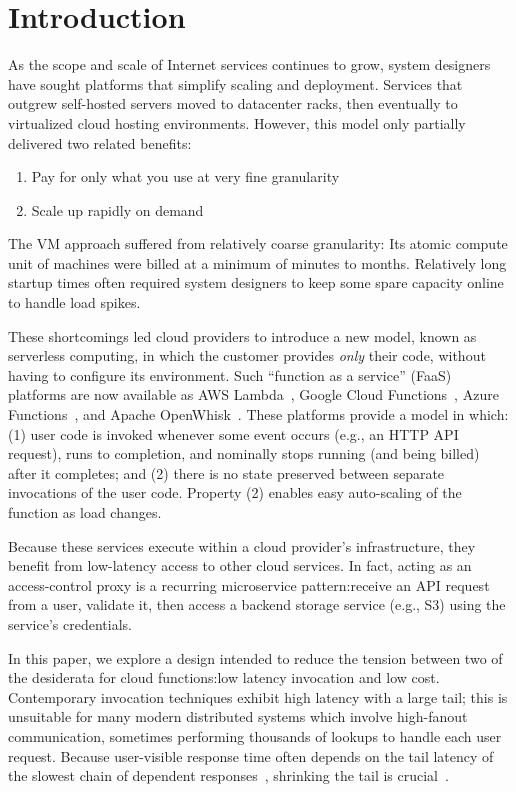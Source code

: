 \section{Introduction}
\label{sec:intro}

As the scope and scale of Internet services continues to grow, system designers
have sought platforms that simplify scaling and deployment.
Services that outgrew self-hosted servers moved to datacenter racks, then
eventually to virtualized cloud hosting environments.
However, this model only partially delivered two related benefits:
\begin{enumerate}
\item Pay for only what you use at very fine granularity
\item Scale up rapidly on demand
\end{enumerate}

\noindent
The VM approach suffered from relatively coarse granularity:  Its atomic compute unit
of machines were billed at a minimum of minutes to months.  Relatively long startup
times often required system designers to keep some spare capacity online to handle
load spikes.

These shortcomings led cloud providers to introduce a new model, known as
serverless computing, in which the customer provides \textit{only} their code,
without having to configure its environment.   Such ``function as a service''
(FaaS) platforms are now available as AWS Lambda~\cite{www-amazon-lambda}, Google
Cloud Functions~\cite{www-google-cf}, Azure Functions~\cite{www-microsoft-af}, and
Apache OpenWhisk~\cite{www-apache-openwhisk}.  These platforms provide a model in
which: (1)  user code is invoked whenever some event occurs (e.g., an HTTP
API request), runs to completion, and nominally stops running (and being
billed) after it completes; and (2)  there is no state preserved between
separate invocations of the user code.  Property (2) enables easy auto-scaling
of the function as load changes.

Because these services execute within a cloud provider's
infrastructure, they benefit from low-latency access to other cloud
services.  In fact, acting as an access-control proxy is a recurring microservice
pattern:\@ receive an API request from a user, validate it, then access
a backend storage service (e.g., S3) using the service's credentials.

In this paper, we explore a design intended to reduce the tension between two of
the desiderata for cloud functions:\@ low latency invocation and low cost.  Contemporary
invocation techniques exhibit high latency with a
large tail; this is
unsuitable for many modern distributed systems which involve
high-fanout communication, sometimes performing thousands of
lookups to handle each user request.  Because user-visible response time often
depends on the tail latency of the slowest chain of dependent
responses~\cite{Dean:cacm2013}, shrinking the tail is crucial~\cite{Jalaparti:sigcomm2013,
Xu:nsdi2013,Li:socc2014,Jeon:asplos2016}.


